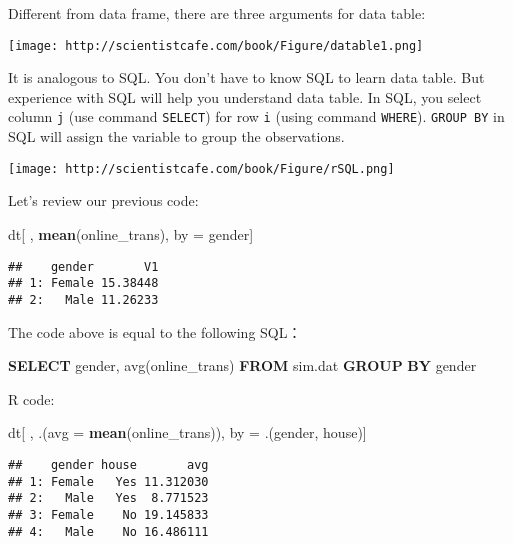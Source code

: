 \documentclass[
]{article}
\newenvironment{Shaded}{\begin{snugshade}}{\end{snugshade}}
\newcommand{\DataTypeTok}[1]{\textcolor[rgb]{0.13,0.29,0.53}{#1}}
\newcommand{\FunctionTok}[1]{\textcolor[rgb]{0.00,0.00,0.00}{#1}}
\newcommand{\KeywordTok}[1]{\textcolor[rgb]{0.13,0.29,0.53}{\textbf{#1}}}
\newcommand{\NormalTok}[1]{#1}
\newcommand{\StringTok}[1]{\textcolor[rgb]{0.31,0.60,0.02}{#1}}
\begin{document}
Different from data frame, there are three arguments for data table:

\texttt{[image: http://scientistcafe.com/book/Figure/datable1.png]}

It is analogous to SQL. You don't have to know SQL to learn data table.
But experience with SQL will help you understand data table. In SQL, you
select column \texttt{j} (use command \texttt{SELECT}) for row
\texttt{i} (using command \texttt{WHERE}). \texttt{GROUP\ BY} in SQL
will assign the variable to group the observations.

\texttt{[image: http://scientistcafe.com/book/Figure/rSQL.png]}

Let's review our previous code:

\begin{Shaded}
\begin{Highlighting}[]
\NormalTok{dt[ , }\KeywordTok{mean}\NormalTok{(online_trans), by =}\StringTok{ }\NormalTok{gender]}
\end{Highlighting}
\end{Shaded}

\begin{verbatim}
##    gender       V1
## 1: Female 15.38448
## 2:   Male 11.26233
\end{verbatim}

The code above is equal to the following SQL：

\begin{Shaded}
\begin{Highlighting}[]
\KeywordTok{SELECT}\NormalTok{  gender, }\FunctionTok{avg}\NormalTok{(online_trans) }\KeywordTok{FROM}\NormalTok{ sim.dat }\KeywordTok{GROUP} \KeywordTok{BY}\NormalTok{ gender}
\end{Highlighting}
\end{Shaded}

R code:

\begin{Shaded}
\begin{Highlighting}[]
\NormalTok{dt[ , .(}\DataTypeTok{avg =} \KeywordTok{mean}\NormalTok{(online_trans)), by =}\StringTok{ }\NormalTok{.(gender, house)]}
\end{Highlighting}
\end{Shaded}

\begin{verbatim}
##    gender house       avg
## 1: Female   Yes 11.312030
## 2:   Male   Yes  8.771523
## 3: Female    No 19.145833
## 4:   Male    No 16.486111
\end{verbatim}
\end{document}
